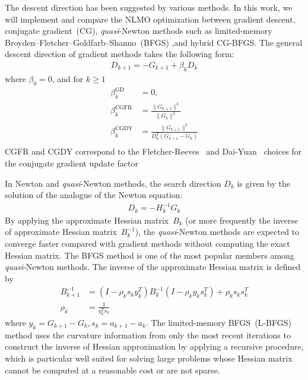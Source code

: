 \documentclass[aps,prl,reprint,amsmath,amssymb]{revtex4-1}
\begin{document}
The descent direction has been suggested by various methods. In this work, we will implement and compare the NLMO optimization between gradient descent, conjugate gradient~(CG),  \emph{quasi}-Newton methods such as limited-memory Broyden–Fletcher–Goldfarb–Shanno~(BFGS) ,and hybrid CG-BFGS. The general descent direction of gradient methods takes the following form:
%
\begin{equation} \label{eq:descent_dir}
\begin{split}
D_{k+1} = -G_{k+1} + \beta_k D_{k}
\end{split}
\end{equation}
%
where  $\beta_0=0$, and for $k \geq 1$
\begin{equation} \label{eq:beta}
\begin{split}
\beta_{k}^\text{GD} &= 0, \\
\beta_{k}^\text{CGFR} &= \frac{\lVert{G_{k+1}}\rVert^2}{\lVert{G_{k}}\rVert^2} \\
\beta_{k}^\text{CGDY} &=  \frac{\lVert{G_{k+1}}\rVert^2}{D_{k}^{T}(G_{k+1}-G_{k})} \\
\end{split}
\end{equation}
%
CGFR and CGDY correspond to the Fletcher-Reeves~\citep{fletcher1964function}  and Dai-Yuan~\cite{dai1999nonlinear} choices for the conjugate gradient update factor




In Newton and \emph{quasi}-Newton  methods, the search direction $D_{k}$ is given by the solution of the analogue of the Newton equation:
%
\begin{equation} \label{eq:newton_dir}
\begin{split}
D_{k} = -H_{k}^{-1}G_{k}
\end{split}
\end{equation}
%
By applying the approximate Hessian matrix~$B_{k}$ (or more frequently the inverse of approximate Hessian matrix~$B_{k}^{-1}$),  the \emph{quasi}-Newton methods are expected to converge faster compared with gradient methods without computing the exact Hessian matrix. The BFGS method is one of the most popular members among  \emph{quasi}-Newton methods. The inverse of the approximate Hessian matrix is defined by 
%
\begin{equation} \label{eq:bfgs_inverH}
\begin{split}
B_{k+1}^{-1}  &= (I - \rho_{k}s_{k}y_{k}^{T})B_{k}^{-1}(I - \rho_{k}y_{k}s_{k}^{T}) + \rho_{k}s_{k}s_{k}^{T} \\
\rho_{k} &= \frac{1}{y_{k}^{T}s_{k}}
\end{split}
\end{equation}
%
where $y_{k} = G_{k+1} - G_{k}, s_{k} = a_{k+1} - a_{k}$.
The limited-memory BFGS~(L-BFGS) method uses the curvature information from only the most recent iterations to construct the inverse of Hessian approximation by applying a recursive procedure, which is particular well suited for solving large problems whose Hessian matrix cannot be computed at a reasonable cost or are not sparse.
\end{document}
